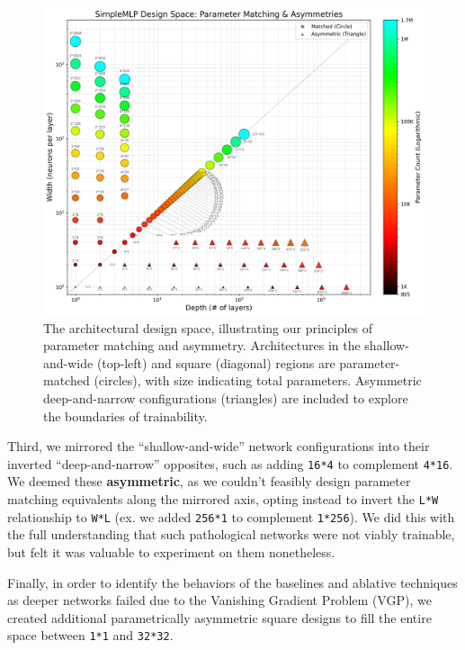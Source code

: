\documentclass[conference]{IEEEtran}
\begin{document}
\begin{figure}[ht]
    \centering
    \includegraphics[width=\linewidth]{SimpleMLP_Heatmap_Parameter_Matching.png}
    \caption{The architectural design space, illustrating our principles of parameter matching and asymmetry. Architectures in the shallow-and-wide (top-left) and square (diagonal) regions are parameter-matched (circles), with size indicating total parameters. Asymmetric deep-and-narrow configurations (triangles) are included to explore the boundaries of trainability.}
    \label{fig:heatmap_param_matching}
\end{figure}

Third, we mirrored the ``shallow-and-wide'' network configurations into their inverted ``deep-and-narrow'' opposites, such as adding \verb|16*4| to complement \verb|4*16|. We deemed these \textbf{asymmetric}, as we couldn't feasibly design parameter matching equivalents along the mirrored axis, opting instead to invert the \verb|L*W| relationship to \verb|W*L| (ex. we added \verb|256*1| to complement \verb|1*256|). We did this with the full understanding that such pathological networks were not viably trainable, but felt it was valuable to experiment on them nonetheless.

Finally, in order to identify the behaviors of the baselines and ablative techniques as deeper networks failed due to the Vanishing Gradient Problem (VGP), we created additional parametrically asymmetric square designs to fill the entire space between \verb|1*1| and \verb|32*32|.
\end{document}
